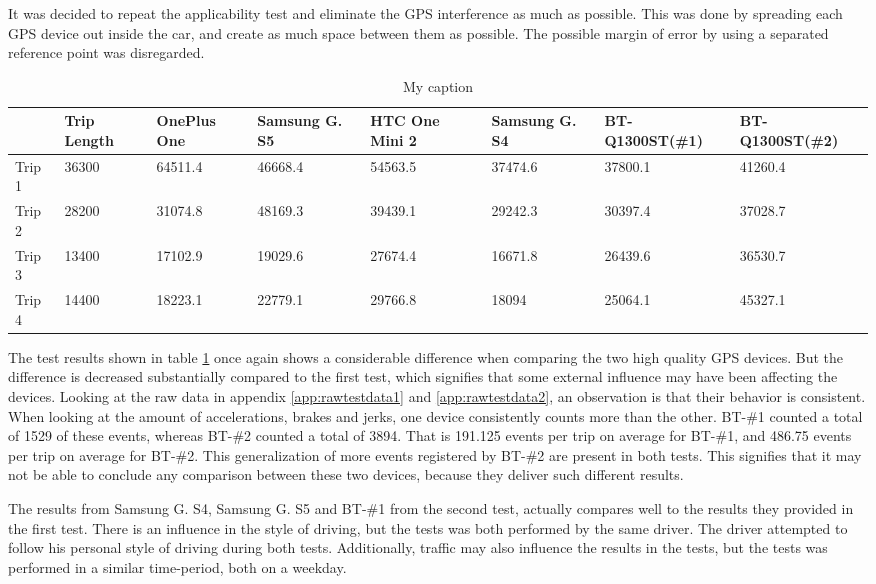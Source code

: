 It was decided to repeat the applicability test and eliminate the GPS interference as much as possible. This was done by spreading each GPS device out inside the car, and create as much space between them as possible. The possible margin of error by using a separated reference point was disregarded. 

\begin{table}[tb]
\centering
\caption{My caption}
\label{tab:smartphone_test_two}
\begin{tabular}{|l|lllllll}
\hline
\rowcolor{tablegreen}
       & Trip Length & OnePlus One & Samsung G. S5 & HTC One Mini 2 & Samsung G. S4 & BT-Q1300ST(\#1) & BT-Q1300ST(\#2) \\\hline
Trip 1 & 36300       & 64511.4     & 46668.4       & 54563.5        & 37474.6       & 37800.1         & 41260.4         \\
Trip 2 & 28200       & 31074.8     & 48169.3       & 39439.1        & 29242.3       & 30397.4         & 37028.7         \\
Trip 3 & 13400       & 17102.9     & 19029.6       & 27674.4        & 16671.8       & 26439.6         & 36530.7         \\
Trip 4 & 14400       & 18223.1     & 22779.1       & 29766.8        & 18094         & 25064.1         & 45327.1         \\\hline
\end{tabular}
\end{table}

The test results shown in table \ref{tab:smartphone_test_two} once again shows a considerable difference when comparing the two high quality GPS devices. But the difference is decreased substantially compared to the first test, which signifies that some external influence may have been affecting the devices. Looking at the raw data in appendix \ref{app:rawtestdata1} and \ref{app:rawtestdata2}, an observation is that their behavior is consistent. When looking at the amount of accelerations, brakes and jerks, one device consistently counts more than the other. BT-\#1 counted a total of 1529 of these events, whereas BT-\#2 counted a total of 3894. That is 191.125 events per trip on average for BT-\#1, and 486.75 events per trip on average for BT-\#2. This generalization of more events registered by BT-\#2 are present in both tests. This signifies that it may not be able to conclude any comparison between these two devices, because they deliver such different results.

The results from Samsung G. S4, Samsung G. S5 and BT-\#1 from the second test, actually compares well to the results they provided in the first test. There is an influence in the style of driving, but the tests was both performed by the same driver. The driver attempted to follow his personal style of driving during both tests. Additionally, traffic may also influence the results in the tests, but the tests was performed in a similar time-period, both on a weekday. 

